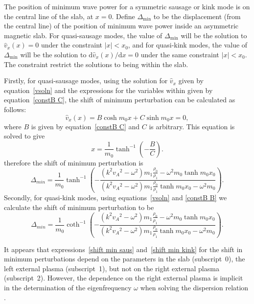 \documentclass[namedreferences]{solarphysics}
\numberwithin{equation}{section}
\begin{document}
\begin{article}
The position of minimum wave power for a symmetric sausage or kink mode is on the central line of the slab, at $x=0$. Define $\Delta_\textrm{min}$ to be the displacement (from the central line) of the position of minimum wave power inside an asymmetric magnetic slab. For quasi-sausage modes, the value of $\Delta_\textrm{min}$ will be the solution to $\widehat{v}_x(x) = 0$ under the constraint $|x| < x_0$, and for quasi-kink modes, the value of $\Delta_\textrm{min}$ will be the solution to $\textrm{d}\widehat{v}_x (x) / \textrm{d}x = 0$ under the same constraint $|x| < x_0$. The constraint restrict the solutions to being within the slab. 

Firstly, for quasi-sausage modes, using the solution for $\widehat{v}_x$ given by equation~\eqref{vsoln} and the expressions for the variables within given by equation~\eqref{constB C}, the shift of minimum perturbation can be calculated as follows:
\begin{equation}
\widehat{v}_x(x) = B\cosh{m_0x}+C\sinh{m_0x} = 0,
\end{equation}
where $B$ is given by equation~\eqref{constB C} and $C$ is arbitrary. This equation is solved to give
\begin{equation}
x = \frac{1}{m_0} \tanh^{-1}\left(-\frac{B}{C}\right). \label{disp of min power saus}
\end{equation}
therefore the shift of minimum perturbation is
\begin{equation}
\Delta_{min} = \frac{1}{m_0}\tanh^{-1}\left(-\frac{(k^2{v_A}^2-\omega^2)m_1\frac{\rho_0}{\rho_1} - \omega^2{m_0}\tanh{m_0x_0}}{(k^2{v_A}^2-\omega^2)m_1\frac{\rho_0}{\rho_1}\tanh{m_0x_0} - \omega^2{m_0}}\right). \label{shift min saus}
\end{equation}
Secondly, for quasi-kink modes, using equations~\eqref{vsoln} and \eqref{constB B} we calculate the shift of minimum perturbation to be
\begin{equation}
\Delta_{min} = \frac{1}{m_0}\coth^{-1}\left(-\frac{(k^2{v_A}^2-\omega^2)m_1\frac{\rho_0}{\rho_1} - \omega^2{m_0}\tanh{m_0x_0}}{(k^2{v_A}^2-\omega^2)m_1\frac{\rho_0}{\rho_1}\tanh{m_0x_0} - \omega^2{m_0}}\right). \label{shift min kink}
\end{equation}

It appears that expressions~\eqref{shift min saus} and~\eqref{shift min kink} for the shift in minimum perturbations depend on the parameters in the slab (subscript~0), the left external plasma (subscript~1), but not on the right external plasma (subscript~2). However, the dependence on the right external plasma is implicit in the determination of the eigenfrequency $\omega$ when solving the dispersion relation \citep{all_etal17}.


\end{article}
\end{document}
